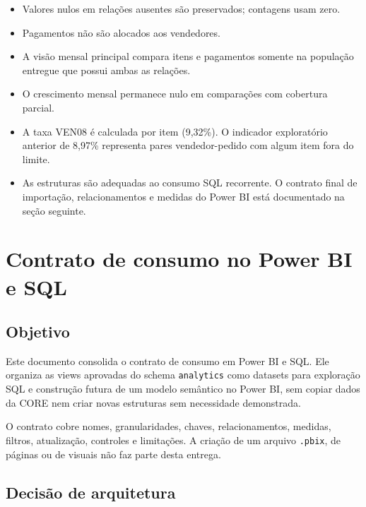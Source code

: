 \documentclass[12pt,a4paper]{article}
\providecommand{\tightlist}{
  \setlength{\itemsep}{0pt}\setlength{\parskip}{0pt}
}
\begin{document}
\begin{itemize}
\tightlist
\item
  Valores nulos em relações ausentes são preservados; contagens usam
  zero.
\item
  Pagamentos não são alocados aos vendedores.
\item
  A visão mensal principal compara itens e pagamentos somente na
  população entregue que possui ambas as relações.
\item
  O crescimento mensal permanece nulo em comparações com cobertura
  parcial.
\item
  A taxa VEN08 é calculada por item (9,32\%). O indicador exploratório
  anterior de 8,97\% representa pares vendedor-pedido com algum item
  fora do limite.
\item
  As estruturas são adequadas ao consumo SQL recorrente. O contrato
  final de importação, relacionamentos e medidas do Power BI está
  documentado na seção seguinte.
\end{itemize}

\section{Contrato de consumo no Power BI e
SQL}\label{docs__analytics__consumo_power_bi_sql.md__contrato-de-consumo-no-power-bi-e-sql}

\subsection{Objetivo}\label{docs__analytics__consumo_power_bi_sql.md__objetivo}

Este documento consolida o contrato de consumo em Power BI e SQL. Ele organiza
as views aprovadas do schema \nolinkurl{analytics} como datasets para
exploração SQL e construção futura de um modelo semântico no Power BI,
sem copiar dados da CORE nem criar novas estruturas sem necessidade
demonstrada.

O contrato cobre nomes, granularidades, chaves, relacionamentos,
medidas, filtros, atualização, controles e limitações. A criação de um
arquivo \nolinkurl{.pbix}, de páginas ou de visuais não faz parte desta
entrega.

\subsection{Decisão de
arquitetura}\label{docs__analytics__consumo_power_bi_sql.md__decisuxe3o-de-arquitetura}
\end{document}

